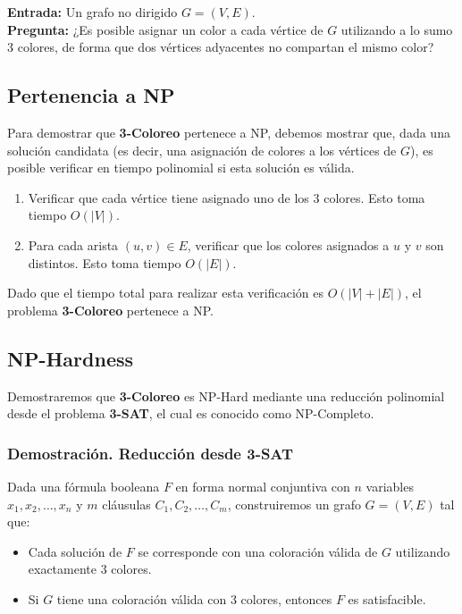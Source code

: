 \documentclass[a4paper,12pt]{article}
\begin{document}
\textbf{Entrada:} Un grafo no dirigido $G = (V, E)$.\\
\textbf{Pregunta:} ¿Es posible asignar un color a cada v\'ertice de $G$ utilizando a lo sumo 3 colores, de forma que dos v\'ertices adyacentes no compartan el mismo color?

\subsection{Pertenencia a NP}
Para demostrar que \textbf{3-Coloreo} pertenece a NP, debemos mostrar que, dada una soluci\'on candidata (es decir, una asignaci\'on de colores a los v\'ertices de $G$), es posible verificar en tiempo polinomial si esta soluci\'on es v\'alida.

\begin{enumerate}
    \item Verificar que cada v\'ertice tiene asignado uno de los 3 colores. Esto toma tiempo $O(|V|)$.
    \item Para cada arista $(u, v) \in E$, verificar que los colores asignados a $u$ y $v$ son distintos. Esto toma tiempo $O(|E|)$.
\end{enumerate}

Dado que el tiempo total para realizar esta verificaci\'on es $O(|V| + |E|)$, el problema \textbf{3-Coloreo} pertenece a NP.

\subsection{NP-Hardness}
Demostraremos que \textbf{3-Coloreo} es NP-Hard mediante una reducci\'on polinomial desde el problema \textbf{3-SAT}, el cual es conocido como NP-Completo.

\subsubsection{Demostración. Reducci\'on desde 3-SAT}
Dada una f\'ormula booleana $F$ en forma normal conjuntiva con $n$ variables $x_1, x_2, \dots, x_n$ y $m$ cl\'ausulas $C_1, C_2, \dots, C_m$, construiremos un grafo $G = (V, E)$ tal que:
\begin{itemize}
    \item Cada soluci\'on de $F$ se corresponde con una coloraci\'on v\'alida de $G$ utilizando exactamente 3 colores.
    \item Si $G$ tiene una coloraci\'on v\'alida con 3 colores, entonces $F$ es satisfacible.
\end{itemize}
\end{document}

